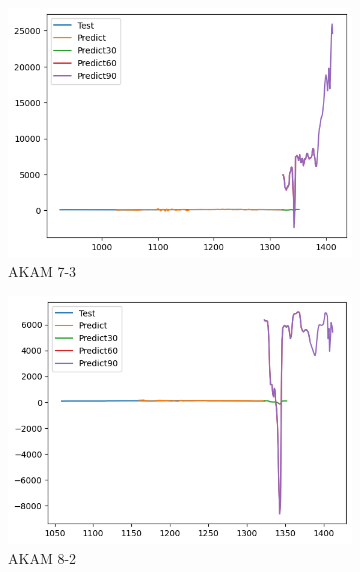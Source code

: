 \documentclass{ieeeojies}
\begin{document}
\begin{figure}[htbp]
    \centering
    \begin{subfigure}[b]{0.33\linewidth}
        \centering
        \includegraphics[width=\linewidth]{AddRNN Plot/AddRNN_AKAM_7_3.png}
        \caption{AKAM 7-3}
        \label{fig:akam-7-3}
    \end{subfigure}%
    \hfill
    \begin{subfigure}[b]{0.33\linewidth}
        \centering
        \includegraphics[width=\linewidth]{AddRNN Plot/AddRNN_AKAM_8_2.png}
        \caption{AKAM 8-2}
        \label{fig:akam-8-2}
    \end{subfigure}%
    \hfill
    \begin{subfigure}[b]{0.33\linewidth}
        \centering

\end{subfigure}
\end{figure}
\end{document}
